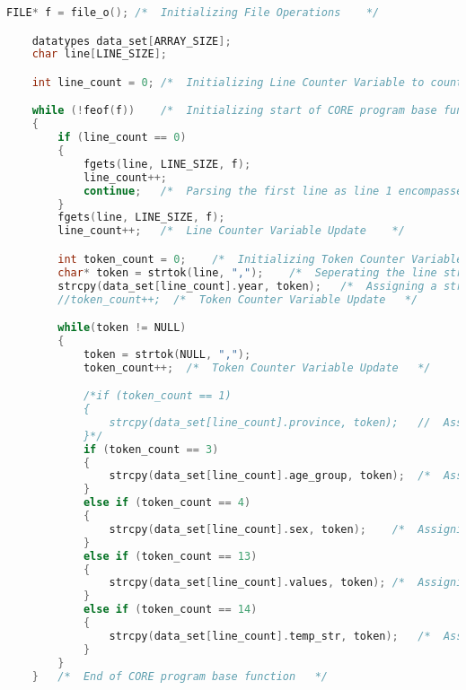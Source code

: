 \begin{lstlisting}[language=C, caption=\textit{CPS 188 Term Project Source Code}]
    FILE* f = file_o(); /*  Initializing File Operations    */

    datatypes data_set[ARRAY_SIZE];
    char line[LINE_SIZE];

    int line_count = 0; /*  Initializing Line Counter Variable to count Lines in the File   */

    while (!feof(f))    /*  Initializing start of CORE program base function    */
    {
        if (line_count == 0)
        {
            fgets(line, LINE_SIZE, f);
            line_count++;
            continue;   /*  Parsing the first line as line 1 encompasses labels and headers which are of no relavance   */
        }
        fgets(line, LINE_SIZE, f);
        line_count++;   /*  Line Counter Variable Update    */

        int token_count = 0;    /*  Initializing Token Counter Variable to count the tokens after String Tokenization   */
        char* token = strtok(line, ",");    /*  Seperating the line string into subsequent smaller string based on Comma Seperation & Tokenizing a slice of string after "," delimiter as a parameter   */
        strcpy(data_set[line_count].year, token);   /*  Assigning a string value for the Year from this base iteration of Var(token) [NO CONDITION REQUIRED - FIRST FIED ENTRY IN FILE] */
        //token_count++;  /*  Token Counter Variable Update   */

        while(token != NULL)
        {
            token = strtok(NULL, ",");
            token_count++;  /*  Token Counter Variable Update   */

            /*if (token_count == 1)
            {
                strcpy(data_set[line_count].province, token);   //  Assigning a string value for Province from this iteration of Var(token) if conditional satisfied
            }*/
            if (token_count == 3)
            {
                strcpy(data_set[line_count].age_group, token);  /*  Assiging a string value of Age Goup from this iteration of Var(token) if conditional is satisfied   */
            }
            else if (token_count == 4)
            {
                strcpy(data_set[line_count].sex, token);    /*  Assigning a string value of Sex from this iteration of Var(token) if conditional is satisfied   */
            }
            else if (token_count == 13)
            {
                strcpy(data_set[line_count].values, token); /*  Assigning a string value of Values (Raw Percentage Floats) from this iterationm of Var(token) if condition is satisfied */
            }
            else if (token_count == 14)
            {
                strcpy(data_set[line_count].temp_str, token);   /*  Assigning a string temp trash value of string literal's after Var(values) to disregard "\"" delimiter from being concatenated into Values string [CONDITION IS ALWAYS SATISFIED - TOTAL TOKEN COUNT IS 19 - temp_str HAS FREE malloc(20) per cycle allocation]  */
            }
        }
    }   /*  End of CORE program base function   */


\end{lstlisting}
